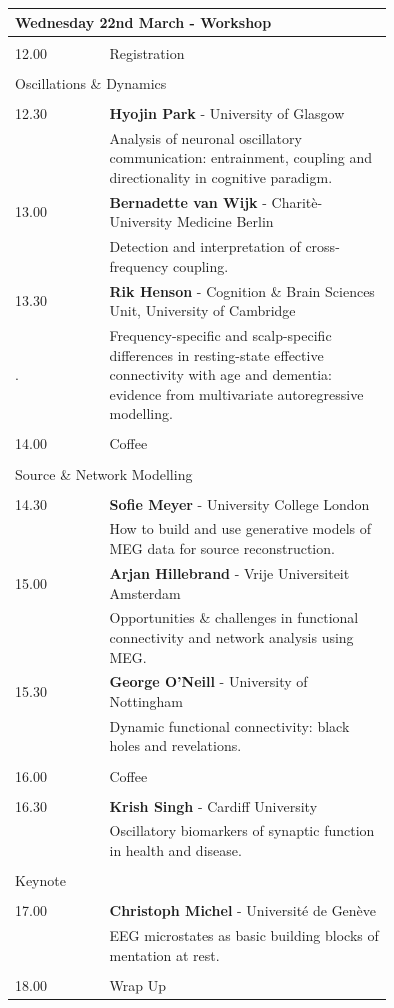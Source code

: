 \documentclass[12pt,a4paper]{article}
\begin{document}
\pagebreak
\vspace{1cm}

\begin{tabular}{l p{0.75\linewidth}}
\multicolumn{2}{l}{\Large Wednesday 22nd March - Workshop} \\
\toprule
&  \\
12.00 & Registration \\
&  \\
\multicolumn{2}{l}{\large Oscillations \& Dynamics } \\
&  \\
12.30 & {\bf Hyojin Park} - {\small University of Glasgow} \\
& { Analysis of neuronal oscillatory communication: entrainment, coupling and directionality in cognitive paradigm.} \\
13.00 & {\bf Bernadette van Wijk} - {\small Charit\`e-University Medicine Berlin} \\
& { Detection and interpretation of cross-frequency coupling.} \\
13.30 & {\bf Rik Henson} - {\small Cognition \& Brain Sciences Unit, University of Cambridge} \\.
& { Frequency-specific and scalp-specific differences in resting-state effective connectivity with age and dementia: evidence from multivariate autoregressive modelling.} \\
&  \\
14.00 &  Coffee\\
&  \\
\multicolumn{2}{l}{\large Source \& Network Modelling} \\
&  \\
14.30 & {\bf Sofie Meyer} - {\small University College London} \\
& { How to build and use generative models of MEG data for source reconstruction.} \\
15.00 & {\bf  Arjan Hillebrand} - {\small Vrije Universiteit Amsterdam} \\
& { Opportunities \& challenges in functional connectivity and network analysis using MEG.} \\
15.30 & {\bf  George O'Neill} - {\small University of Nottingham} \\
& { Dynamic functional connectivity: black holes and revelations.} \\
\\
16.00 &  Coffee\\
&  \\
16.30 & {\bf Krish Singh} - {\small Cardiff University} \\
& { Oscillatory biomarkers of synaptic function in health and disease.} \\
&  \\
\multicolumn{2}{l}{\large Keynote} \\
&  \\
17.00 & {\bf Christoph Michel} - {\small Universit\'{e} de Gen\`{e}ve}\\
& { EEG microstates as basic building blocks of mentation at rest.} \\
&  \\
18.00 &  Wrap Up\\
\bottomrule
\end{tabular}
\end{document}
